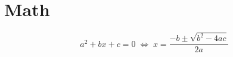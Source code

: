 \section{Math}

\begin{equation*}
    a^2 + bx + c = 0 \; \Longleftrightarrow \; x = \frac{-b \pm \sqrt{b^2 - 4ac}}{2a}
\end{equation*}
